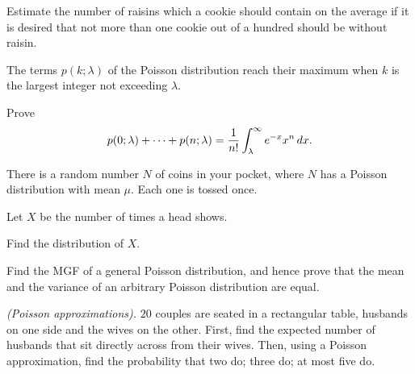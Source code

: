\begin{problem}[Handout 10, \# 9]
  Estimate the number of raisins which a cookie should contain on the
  average if it is desired that not more than one cookie out of a hundred
  should be without raisin.
\end{problem}
\begin{solution*}

\end{solution*}

\begin{problem}[Handout 10, \# 10]
  The terms \(p(k;\lambda)\) of the Poisson distribution reach their
  maximum when \(k\) is the largest integer not exceeding \(\lambda\).
\end{problem}
\begin{solution*}

\end{solution*}

\begin{problem}[Handout 10, \# 11]
  Prove
  \[
    p(0;\lambda)+\dotsb+p(n;\lambda) =\frac{1}{n!}\int_\lambda^\infty
    e^{-x}x^n\mathop{}\!d x.
  \]
\end{problem}
\begin{solution*}

\end{solution*}

\begin{problem}[Handout 10, \# 12]
  There is a random number \(N\) of coins in your pocket, where \(N\) has a
  Poisson distribution with mean \(\mu\). Each one is tossed once.

  \noindent Let \(X\) be the number of times a head shows.

  \noindent Find the distribution of \(X\).
\end{problem}
\begin{solution*}

\end{solution*}

\begin{problem}[Handout 10, \# 14]
  Find the MGF of a general Poisson distribution, and hence prove that the
  mean and the variance of an arbitrary Poisson distribution are equal.
\end{problem}
\begin{solution*}

\end{solution*}

\begin{problem}[Handout 10, \# 17 (a)]
  \emph{(Poisson approximations).} \(20\) couples are seated in a
  rectangular table, husbands on one side and the wives on the
  other. First, find the expected number of husbands that sit directly
  across from their wives. Then, using a Poisson approximation, find the
  probability that two do; three do; at most five do.
\end{problem}
\begin{solution*}

\end{solution*}

